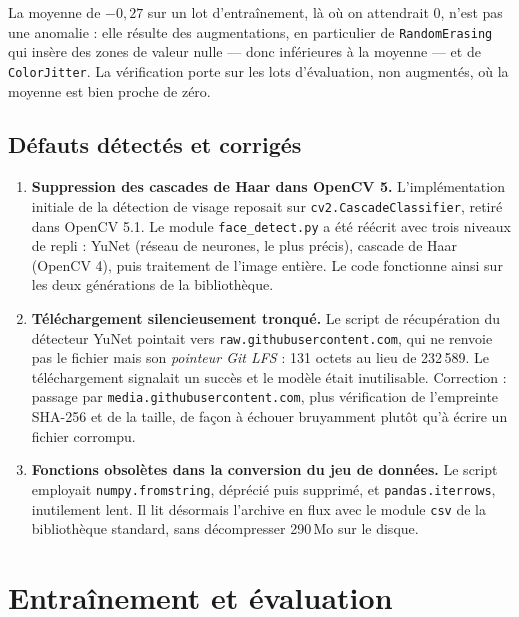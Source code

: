\documentclass[11pt,a4paper]{article}
\newcommand{\code}[1]{\texttt{\small #1}}
\begin{document}
La moyenne de $-0{,}27$ sur un lot d'entraînement, là où on attendrait $0$, n'est
pas une anomalie : elle résulte des augmentations, en particulier de
\code{RandomErasing} qui insère des zones de valeur nulle --- donc inférieures à
la moyenne --- et de \code{ColorJitter}. La vérification porte sur les lots
d'évaluation, non augmentés, où la moyenne est bien proche de zéro.

\subsection{Défauts détectés et corrigés}
\label{sec:defauts}

\begin{enumerate}[leftmargin=*,itemsep=4pt]
\item \textbf{Suppression des cascades de Haar dans OpenCV 5.}
L'implémentation initiale de la détection de visage reposait sur
\code{cv2.CascadeClassifier}, retiré dans OpenCV 5.1. Le module
\code{face\_detect.py} a été réécrit avec trois niveaux de repli : YuNet (réseau
de neurones, le plus précis), cascade de Haar (OpenCV 4), puis traitement de
l'image entière. Le code fonctionne ainsi sur les deux générations de la
bibliothèque.

\item \textbf{Téléchargement silencieusement tronqué.}
Le script de récupération du détecteur YuNet pointait vers
\code{raw.githubusercontent.com}, qui ne renvoie pas le fichier mais son
\emph{pointeur Git LFS} : 131 octets au lieu de 232\,589. Le téléchargement
signalait un succès et le modèle était inutilisable. Correction : passage par
\code{media.githubusercontent.com}, plus vérification de l'empreinte SHA-256 et
de la taille, de façon à échouer bruyamment plutôt qu'à écrire un fichier
corrompu.

\item \textbf{Fonctions obsolètes dans la conversion du jeu de données.}
Le script employait \code{numpy.fromstring}, déprécié puis supprimé, et
\code{pandas.iterrows}, inutilement lent. Il lit désormais l'archive en flux
avec le module \code{csv} de la bibliothèque standard, sans décompresser 290\,Mo
sur le disque.
\end{enumerate}

\section{Entraînement et évaluation}
\end{document}
